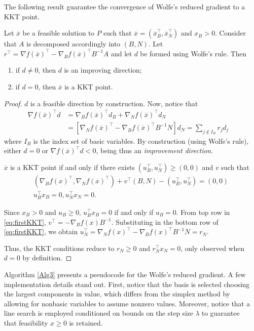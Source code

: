 The following result guarantee the convergence of Wolfe's reduced gradient to a KKT point.
%
\begin{theorem}
Let $\overline{x}$ be a feasible solution to $P$ such that $\overline{x} = (\overline{x}_B^\top, \overline{x}_N^\top)$ and $x_B > 0$. 
Consider that $A$ is decomposed accordingly into $(B,N)$. Let $r^\top = \nabla f(\overline{x})^\top - \nabla_B f(\overline{x})^\top B^{-1}A$ and let $d$ be formed using Wolfe's rule. Then
\begin{enumerate}
\item if $d \neq 0$, then $d$ is an improving direction;
\item if $d = 0$, then $\overline{x}$ is a KKT point.
\end{enumerate}
\end{theorem}
%
\begin{proof}
$d$ is a feasible direction by construction. Now, notice that 
\begin{align*}
\nabla f(\overline{x}) ^\top d &= \nabla_B f(\overline{x})^\top d_B + \nabla_N f(\overline{x})^\top d_N \\
& = [\nabla_N f(\overline{x})^\top - \nabla_B f(\overline{x})^\top B^{-1}N]d_N = \sum_{j \notin I_B}r_jd_j
\end{align*}
where $I_B$ is the index set of basic variables. By construction (using Wolfe's rule), either $d=0$ or $\nabla f(\overline{x})^\top d < 0$, being thus an \emph{improvement direction}.

$\overline{x}$ is a KKT point if and only if there exists $(u_B^\top, u_N^\top) \geq (0, 0)$ and $v$ such that
\begin{align}
&(\nabla_B f(x)^\top, \nabla_N f (x)^\top) + v^\top(B,N) - (u_B^\top, u_N^\top) = (0,0) \label{eq:firstKKT}\\
&u_B^\top x_B = 0, u_N^\top x_N = 0. \label{eq:secondKKT}
\end{align}

Since $x_B > 0$ and $u_B \geq 0$, $u_B^\top x_B = 0$ if and only if $u_B = 0$. From top row in \eqref{eq:firstKKT}, $v^\top = -\nabla_Bf(x)B^{-1}$. Substituting in the bottom row of \eqref{eq:firstKKT}, we obtain $u_N^\top = \nabla_N f(x)^\top - \nabla_B f(x)^\top B^{-1}N = r_N$.

Thus, the KKT conditions reduce to $r_N \geq 0$ and $r_N^\top x_N = 0$, only observed when $d = 0$ by definition.
\end{proof}

Algorithm \ref{Alg3} presents a pseudocode for the Wolfe's reduced gradient. A few implementation details stand out. First, notice that the basis is selected choosing the largest components in value, which differs from the simplex method by allowing for nonbasic variables to assume nonzero values. Moreover, notice that a line search is employed conditioned on bounds on the step size $\lambda$ to guarantee that feasibility $x \geq 0 $ is retained. 

